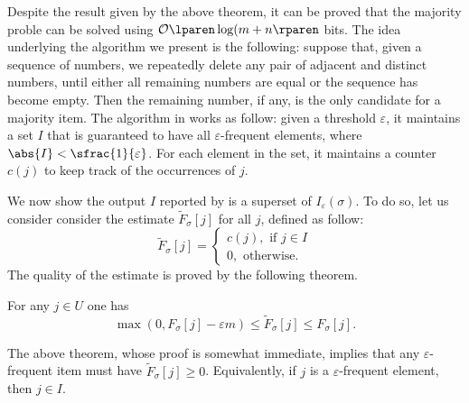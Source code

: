\documentclass{subfiles}
\begin{document}
    Despite the result given by the above theorem, 
        it can be proved that the majority proble can be solved using \(\ofO{\log (m + n}\) bits.
        The idea underlying the algorithm we present is the following: suppose that,
        given a sequence of numbers, we repeatedly delete any pair of adjacent and distinct numbers,
        until either all remaining numbers are equal or the sequence has become empty. 
        Then the remaining number, if any, is the only candidate for a majority item.
        The algorithm in  works as follow: given a threshold \(\varepsilon\),
        it maintains a set \(I\) that is guaranteed to have all \(\varepsilon\)-frequent 
        elements, where \(\abs{I} < \sfrac{1}{\varepsilon}\). For each element in
        the set, it maintains a counter \(c(j)\) to keep track of the occurrences of \(j\).

    
    We now show the output \(I\) reported by  is a superset of \(I_{\varepsilon}(\sigma)\).
        To do so, let us consider consider the estimate \(\tilde{F}_{\sigma}[j]\) for all \(j\),
        defined as follow:
        \[
            \tilde{F}_{\sigma}[j] = \begin{cases}
                c(j), \text{ if } j \in I \\ 
                0, \text{ otherwise. }
            \end{cases}
        \]
        The quality of the estimate is proved by the following theorem.
        \begin{theorem*}
            For any \(j \in U\) one has
            \[
                \max(0, F_{\sigma}[j] - \varepsilon m) \le \tilde{F}_{\sigma}[j] \le F_{\sigma}[j].
            \]
        \end{theorem*}
        The above theorem, whose proof is somewhat immediate, implies that any \(\varepsilon\)-frequent
        item must have \(\tilde{F}_{\sigma}[j] \ge 0\). 
        Equivalently, if \(j\) is a \(\varepsilon\)-frequent element, then \(j \in I\).
\end{document}
